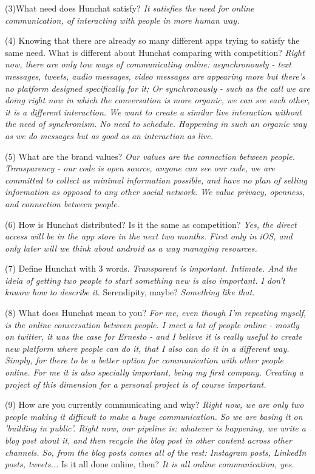 \documentclass[12pt]{article}
\begin{document}
(3)What need does Hunchat satisfy? \textit{It satisfies the need for online communication, of interacting with people in more human way.}

(4) Knowing that there are already so many different apps trying to satisfy the same need. What is different about Hunchat comparing with competition?  \textit{Right now, there are only tow ways of communicating online: asynchronously - text messages, tweets, audio messages, video messages are appearing more but there's no platform designed specifically for it; Or synchronously - such as the call we are doing right now in which the conversation is more organic, we can see each other, it is a different interaction. We want to create a similar live interaction without the need of synchronism. No need to schedule. Happening in such an organic way as we do messages but as good as an interaction as live. } 

(5) What are the brand values? \textit{Our values are the connection between people. Transparency - our code is open source, anyone can see our code, we are committed to collect as minimal information possible, and have no plan of selling information as opposed to any other social network. We value privacy, openness, and connection between people.}

(6) How is Hunchat distributed? Is it the same as competition? \textit{Yes, the direct access will be in the app store in the next two months. First only in iOS, and only later will we think about android as a way managing resources.}

(7) Define Hunchat with 3 words. \textit{Transparent is important. Intimate. And the ideia of getting two people to start something new is also important. I don't knwow how to describe it.} Serendipity, maybe? \textit{Something like that.}

(8) What does Hunchat mean to you? \textit{For me, even though I'm repeating myself, is the online conversation between people. I meet a lot of people online - mostly on twitter, it was the case for Ernesto - and I believe it is really useful to create new platform where people can do it, that I also can do it in a different way. Simply, for there to be a better option for communication with other people online. For me it is also specially important, being my first company. Creating a project of this dimension for a personal project is of course important.}

(9) How are you currently communicating and why? \textit{Right now, we are only two people making it difficult to make a huge communication. So we are basing it on 'building in public'. Right now, our pipeline is: whatever is happening, we write a blog post about it, and then recycle the blog post in other content across other channels. So, from the blog posts comes all of the rest: Instagram posts, LinkedIn posts, tweets...} Is it all done online, then? \textit{It is all online communication, yes.}
\end{document}
